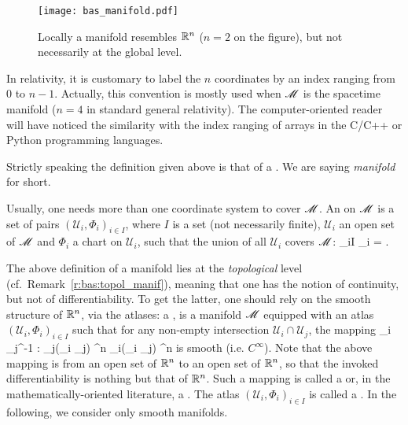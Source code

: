\begin{figure}
\centerline{\texttt{[image: bas\_manifold.pdf]}}
\caption[]{\label{f:bas:manifold} \footnotesize
Locally a manifold resembles $\mathbb{R}^n$ ($n=2$ on the figure), but not necessarily at the global level.}
\end{figure}

\begin{remark}
In relativity, it is customary to label the $n$ coordinates by an index
ranging from $0$ to $n-1$. Actually, this convention is mostly used when $\mathscr{M}$ is the spacetime manifold ($n=4$ in standard general relativity). The computer-oriented reader will have noticed the similarity
with the index ranging of arrays in the C/C++ or Python programming languages.
\end{remark}


\begin{remark} \label{r:bas:topol_manif}
Strictly speaking the definition given above is that of a . We are saying \emph{manifold} for short.
\end{remark}


Usually, one needs more than one coordinate system to cover $\mathscr{M}$.
An  on $\mathscr{M}$ is a set of pairs
$(\mathscr{U}_i,\Phi_i)_{i\in I}$,  where $I$ is a set (not necessarily finite), $\mathscr{U}_i$ an open set of $\mathscr{M}$ and $\Phi_i$ a chart on $\mathscr{U}_i$,
such that the union of all $\mathscr{U}_i$ covers $\mathscr{M}$:
\be
    \bigcup_{i\in I} _i = \M.
\ee

The above definition of a manifold lies at the \emph{topological} level
(cf.~Remark~\ref{r:bas:topol_manif}), meaning that one has the notion of continuity, but not of differentiability. To get the latter, one should rely on the smooth structure of $\mathbb{R}^n$, via the atlases:
a ,
is a manifold $\mathscr{M}$ equipped with an atlas
$(\mathscr{U}_i,\Phi_i)_{i\in I}$ such that for any non-empty intersection
$\mathscr{U}_i \cap \mathscr{U}_j$, the mapping
\be \label{e:bas:transition_map}
    \Phi_i \circ \Phi_j^{-1} : \Phi_j(_i \cap {}_j)
    \subset \R^n \longrightarrow \Phi_i(_i \cap {}_j)
    \subset \R^n
\ee
is smooth (i.e. $C^\infty$).
Note that the above mapping is from an open set of $\mathbb{R}^n$ to an open set of $\mathbb{R}^n$, so that the invoked differentiability is nothing but that of $\mathbb{R}^n$.
Such a mapping is called a  or, in the mathematically-oriented literature, a
.
The atlas $(\mathscr{U}_i,\Phi_i)_{i\in I}$  is called a
.
In the following, we consider only smooth manifolds.

